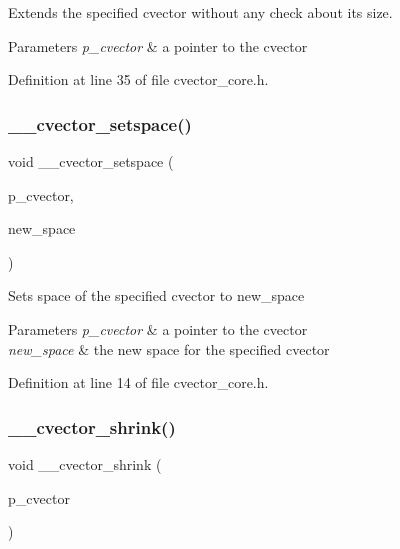 Extends the specified cvector without any check about its size. 
\begin{DoxyParams}{Parameters}
{\em p\+\_\+cvector} & a pointer to the cvector \\
\hline
\end{DoxyParams}


Definition at line 35 of file cvector\+\_\+core.\+h.

\mbox{\label{cvector__interface_8h_a2b3fb7098225f258606f6e87d51a293f}} 
\subsubsection{\+\_\+\+\_\+cvector\+\_\+setspace()}
{\footnotesize\ttfamily void \+\_\+\+\_\+cvector\+\_\+setspace (\begin{DoxyParamCaption}\item[{\textbf{ cvector} $\ast$}]{p\+\_\+cvector,  }\item[{\textbf{ index\+\_\+t}}]{new\+\_\+space }\end{DoxyParamCaption})}

Sets space of the specified cvector to new\+\_\+space 
\begin{DoxyParams}{Parameters}
{\em p\+\_\+cvector} & a pointer to the cvector \\
\hline
{\em new\+\_\+space} & the new space for the specified cvector \\
\hline
\end{DoxyParams}


Definition at line 14 of file cvector\+\_\+core.\+h.

\mbox{\label{cvector__interface_8h_a2ec9a92ee1097fb5aa38c4d30c2bd06d}} 
\subsubsection{\+\_\+\+\_\+cvector\+\_\+shrink()}
{\footnotesize\ttfamily void \+\_\+\+\_\+cvector\+\_\+shrink (\begin{DoxyParamCaption}\item[{\textbf{ cvector} $\ast$}]{p\+\_\+cvector }\end{DoxyParamCaption})}

